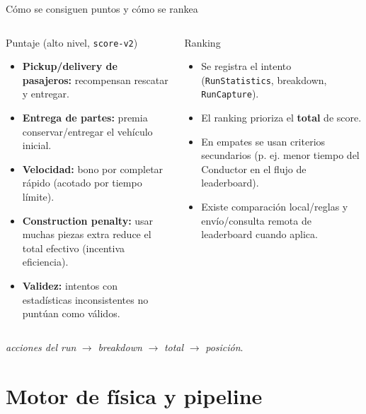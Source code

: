 \documentclass[aspectratio=169,11pt]{beamer}
\begin{document}
\begin{frame}{Cómo se consiguen puntos y cómo se rankea}
  \begin{columns}[T]
    \begin{block}{Puntaje (alto nivel, \texttt{score-v2})}
      \begin{itemize}
        \item \textbf{Pickup/delivery de pasajeros:} recompensan rescatar y entregar.
        \item \textbf{Entrega de partes:} premia conservar/entregar el vehículo inicial.
        \item \textbf{Velocidad:} bono por completar rápido (acotado por tiempo límite).
        \item \textbf{Construction penalty:} usar muchas piezas extra reduce el total efectivo (incentiva eficiencia).
        \item \textbf{Validez:} intentos con estadísticas inconsistentes no puntúan como válidos.
      \end{itemize}
    \end{block}
    \begin{block}{Ranking}
      \begin{itemize}
        \item Se registra el intento (\texttt{RunStatistics}, breakdown, \texttt{RunCapture}).
        \item El ranking prioriza el \textbf{total} de score.
        \item En empates se usan criterios secundarios (p. ej. menor tiempo del Conductor en el flujo de leaderboard).
        \item Existe comparación local/reglas y envío/consulta remota de leaderboard cuando aplica.
      \end{itemize}
    \end{block}
  \end{columns}

  \vspace{0.1cm}
  \begin{center}
    \small \textit{acciones del run} $\rightarrow$ \textit{breakdown} $\rightarrow$ \textit{total} $\rightarrow$ \textit{posición}.
  \end{center}
\end{frame}

\section{Motor de física y pipeline}
\end{document}
